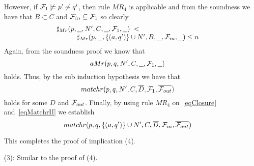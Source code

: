 \begin{theorem}
\begin{trivlist}
\noindent
However, if ${\cal F}_{1}\not\models p'\not\sim q'$, then rule $MR_4$ is applicable and from the soundness we have that $B\subset C$ and ${\cal F}_{in}\subseteq{\cal F}_1$ so clearly
\[
\begin{array}{llll}
\multicolumn{4}{l}{\sharp_{Mr}(p,\underline{\ \ },N',C,\underline{\ \ },{\cal F}_{1},\underline{\ \ })\;<}\\
&&&\sharp_{Mr}(p,\underline{\ \ },\{(a,q')\}\cup N',B,\underline{\ \ },{\cal F}_{in},\underline{\ \ }) \leq n
\end{array}
\]
Again, from the soundness proof we know that
\[
aMr(p,q,N',C,\underline{\ \ },{\cal F}_{1},\underline{\ \ })
\]
holds. Thus, by the sub induction hypothesis we have that
\begin{equation}\label{eqMatchrII}
matchr(p,q,N',C,\overline{D},{\cal F}_{1},\overline{{\cal F}_{out}})
\end{equation}
holds for some $D$ and ${\cal F}_{out}$. Finally, by using rule $MR_4$ on~\ref{eqClosure} and~\ref{eqMatchrII} we establish
\[
matchr(p,q,\{(a,q')\}\cup N',C,\overline{D},{\cal F}_{in},\overline{{\cal F}_{out}})
\]


\noindent
This completes the proof of implication (4).
\end{trivlist}


\item[\rm (3):] Similar to the proof of (4). 



\end{theorem}
